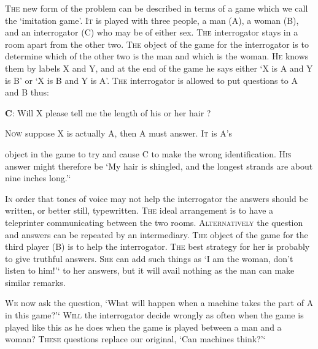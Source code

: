 \documentclass[10pt]{article} %
\begin{document}
\textsc{The} new form of the problem can be described in terms of a game which we call the `imitation game'. \textsc{It} is played with three people, a man (A), a woman (B), and an interrogator (C) who may be of either sex. \textsc{The} interrogator stays in a room apart from the other two. \textsc{The} object of the game for the interrogator is to determine which of the other two is the man and which is the woman. \textsc{He} knows them by labels X and Y, and at the end of the game he says either `X is A and Y is B' or `X is B and Y is A'. \textsc{The} interrogator is allowed to put questions to A and B thus:

\vspace{0.5\baselineskip} %
\textbf{C}: Will X please tell me the length of his or her hair ?\par
\vspace{0.2\baselineskip} %
\textsc{Now} suppose X is actually A, then A must answer. \textsc{It} is A's

object in the game to try and cause C to make the wrong identification. \textsc{His} answer might therefore be
\vspace{0.2\baselineskip} %
`My hair is shingled, and the longest strands are about nine inches long.'`
\vspace{0.5\baselineskip} %

\textsc{In} order that tones of voice may not help the interrogator the answers should be written, or better still, typewritten. \textsc{The} ideal arrangement is to have a teleprinter communicating between the two rooms. \textsc{Alternatively} the question and answers can be repeated by an intermediary. \textsc{The} object of the game for the third player (B) is to help the interrogator. \textsc{The} best strategy for her is probably to give truthful answers. \textsc{She} can add such things as `I am the woman, don't listen to him!'` to her answers, but it will avail nothing as the man can make similar remarks.

\textsc{We} now ask the question, `What will happen when a machine takes the part of A in this game?'` \textsc{Will} the interrogator decide wrongly as often when the game is played like this as he does when the game is played between a man and a woman? \textsc{These} questions replace our original, `Can machines think?'`
\end{document}
